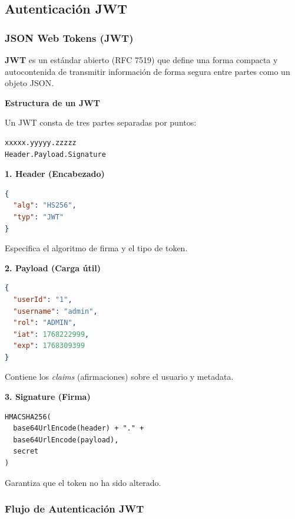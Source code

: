\documentclass[12pt,a4paper]{article}
\begin{document}
\subsection{Autenticación JWT}

\subsubsection{JSON Web Tokens (JWT)}

\textbf{JWT} es un estándar abierto (RFC 7519) que define una forma compacta y autocontenida de transmitir información de forma segura entre partes como un objeto JSON.

\textbf{Estructura de un JWT}

Un JWT consta de tres partes separadas por puntos:

\begin{verbatim}
xxxxx.yyyyy.zzzzz
Header.Payload.Signature
\end{verbatim}

\textbf{1. Header (Encabezado)}
\begin{lstlisting}[language=json]
{
  "alg": "HS256",
  "typ": "JWT"
}
\end{lstlisting}

Especifica el algoritmo de firma y el tipo de token.

\textbf{2. Payload (Carga útil)}
\begin{lstlisting}[language=json]
{
  "userId": "1",
  "username": "admin",
  "rol": "ADMIN",
  "iat": 1768222999,
  "exp": 1768309399
}
\end{lstlisting}

Contiene los \textit{claims} (afirmaciones) sobre el usuario y metadata.

\textbf{3. Signature (Firma)}
\begin{verbatim}
HMACSHA256(
  base64UrlEncode(header) + "." +
  base64UrlEncode(payload),
  secret
)
\end{verbatim}

Garantiza que el token no ha sido alterado.

\subsubsection{Flujo de Autenticación JWT}
\end{document}
